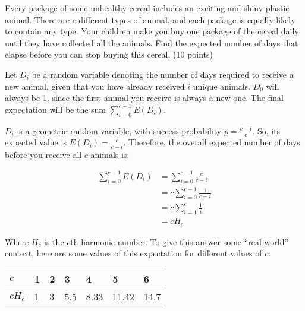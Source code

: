 \documentclass[fleqn]{homework}
\begin{document}
  \begin{problem}{5}
    \begin{question}
      Every package of some unhealthy cereal includes an exciting and shiny
      plastic animal.  There are $c$ different types of animal, and each package
      is equally likely to contain any type.  Your children make you buy one
      package of the cereal daily until they have collected all the animals.
      Find the expected number of days that elapse before you can stop buying
      this cereal. (10 points)
    \end{question}

    Let $D_i$ be a random variable denoting the number of days required to
    receive a new animal, given that you have already received $i$ unique
    animals.  $D_0$ will always be 1, since the first animal you receive is
    always a new one.  The final expectation will be the sum
    $\sum_{i=0}^{c-1} E(D_i)$.

    $D_i$ is a geometric random variable, with success probability
    $p=\frac{c-i}{c}$.  So, its expected value is $E(D_i)=\frac{c}{c-i}$.
    Therefore, the overall expected number of days before you receive all $c$
    animals is:

    \begin{align*}
      \sum_{i=0}^{c-1} E(D_i) &= \sum_{i=0}^{c-1} \frac{c}{c-i} \\
                              &= c \sum_{i=0}^{c-1} \frac{1}{c-i} \\
                              &= c \sum_{i=1}^{c} \frac{1}{i} \\
                              &= c H_c
    \end{align*}

    Where $H_c$ is the $c$th harmonic number.  To give this answer some
    ``real-world'' context, here are some values of this expectation for
    different values of $c$:

    \begin{tabular}{l|llllll}
      $c$ & 1 & 2 & 3 & 4 & 5 & 6 \\
      \hline
      $c H_c$ & 1 & 3 & 5.5 & 8.33 & 11.42 & 14.7
    \end{tabular}
  \end{problem}
\end{document}

